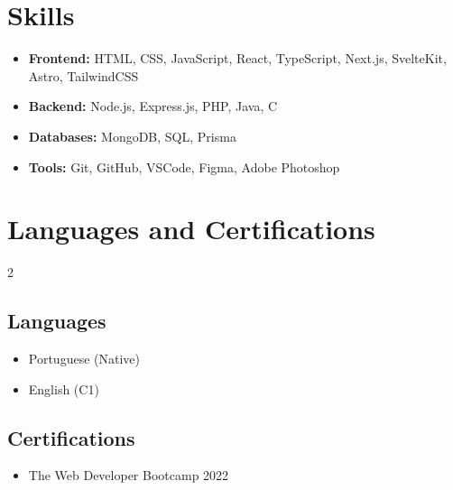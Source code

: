 \documentclass[letterpaper,10pt]{article}
\begin{document}
\section*{Skills}
\begin{itemize}[leftmargin=0.2in]
  \item \textbf{Frontend:} HTML, CSS, JavaScript, React, TypeScript, Next.js, SvelteKit, Astro, TailwindCSS
  \item \textbf{Backend:} Node.js, Express.js, PHP, Java, C
  \item \textbf{Databases:} MongoDB, SQL, Prisma
  \item \textbf{Tools:} Git, GitHub, VSCode, Figma, Adobe Photoshop
\end{itemize}

\section*{Languages and Certifications}
\begin{multicols}{2}
\subsection*{Languages}
\begin{itemize}[leftmargin=0.2in]
  \item Portuguese (Native)
  \item English (C1)
\end{itemize}

\columnbreak

\subsection*{Certifications}
\begin{itemize}[leftmargin=0.2in]
  \item The Web Developer Bootcamp 2022
\end{itemize}
\end{multicols}
\end{document}
